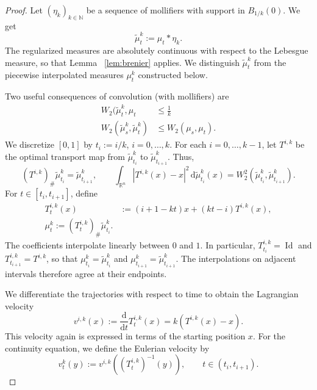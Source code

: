\begin{proof}
	Let $(\eta_k)_{k\in \mathbb{N}}$ be a sequence of mollifiers with support in $B_{1/k}(0)$. We get 
	$$
	\widetilde\mu_t^k:=\mu_t*\eta_k.
	$$
	The regularized measures are absolutely continuous with respect to the Lebesgue measure, so that Lemma ~\ref{lem:brenier} applies. We distinguish $\widetilde\mu_t^k$ from the piecewise interpolated measures $\mu_t^k$ constructed below.

	Two useful consequences of convolution (with mollifiers) are 
	\begin{align*}
		W_2(\widetilde\mu_t^k,\mu_t &\leq \frac{1}{k}\\%
		W_2(\widetilde\mu_s^k,\widetilde\mu_t^k)&\leq W_2(\mu_s,\mu_t).
	\end{align*}
We discretize $[0,1]$ by $t_i:= i/k$, $i=0,\dots,k$. For each $i=0,\dots,k-1$, let $T^{i,k}$ be the optimal transport map from $\widetilde\mu_{t_i}^k$ to $\widetilde\mu_{t_{i+1}}^k$. Thus,
$$
(T^{i,k})_\#\widetilde\mu_{t_i}^k=\widetilde\mu_{t_{i+1}}^k,\qquad \int_{\mathbb{R}^n}|T^{i,k}(x)-x|^2\,\mathrm d\widetilde\mu_{t_i}^k(x) = W_2^2(\widetilde\mu_{t_i}^k,\widetilde\mu_{t_{i+1}}^k).
$$
For $t\in[t_i,t_{i+1}]$, define
\begin{align*}
	T_t^{i,k}(x) &:= (i+1-kt)x+(kt-i)T^{i,k}(x),\\
	\mu_t^k:=(T_t^{i,k})_\#\widetilde\mu_{t_i}^k.
\end{align*}
The coefficients interpolate linearly between $0$ and $1$. In particular, $T_{t_i}^{i,k}=\operatorname{Id}$ and $T_{t_{i+1}}^{i,k}=T^{i,k}$, so that $\mu_{t_i}^k = \widetilde\mu_{t_i}^k$ and $\mu_{t_{i+1}}^k=\widetilde\mu_{t_{i+1}}^k$. The interpolations on adjacent intervals therefore agree at their endpoints.

We differentiate the trajectories with respect to time to obtain the Lagrangian velocity
$$
v^{i,k}(x):=\frac{\mathrm d}{\mathrm dt} T_t^{i,k}(x) = k(T^{i,k}(x)-x).
$$
This velocity again is expressed in terms of the starting position $x$. For the continuity equation, we define the Eulerian velocity by 
$$
v_t^k(y) := v^{i,k}\left((T_t^{i,k})^{-1}(y)\right),\qquad t\in (t_i,t_{i+1}).
$$


\end{proof}
